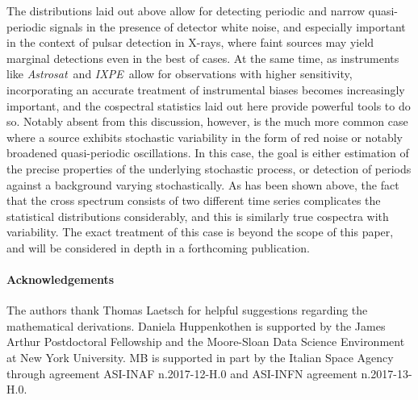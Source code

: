 \documentclass[12pt]{emulateapj}
\newcommand{\project}[1]{\textsl{#1}}
\newcommand{\astrosat}{\project{Astrosat}\xspace}
\newcommand{\ixpe}{\project{IXPE}\xspace}
\begin{document}
The distributions laid out above allow for detecting periodic and narrow quasi-periodic signals in the presence of detector white noise, and especially important in the context of pulsar detection in X-rays, where faint sources may yield marginal detections even in the best of cases. At the same time, as instruments like \astrosat\ and \ixpe\ allow for observations with higher sensitivity, incorporating an accurate treatment of instrumental biases becomes increasingly important, and the cospectral statistics laid out here provide powerful tools to do so.
Notably absent from this discussion, however, is the much more common case where a source exhibits stochastic variability in the form of red noise or notably broadened quasi-periodic oscillations. In this case, the goal is either estimation of the precise properties of the underlying stochastic process, or detection of periods against a background varying stochastically. As has been shown above, the fact that the cross spectrum consists of two different time series complicates the statistical distributions considerably, and this is similarly true cospectra with variability. The exact treatment of this case is beyond the scope of this paper, and will be considered in depth in a forthcoming publication. 


\paragraph{Acknowledgements}
The authors thank Thomas Laetsch for helpful suggestions regarding the mathematical derivations.
Daniela Huppenkothen is supported by the James Arthur Postdoctoral Fellowship and the Moore-Sloan Data Science Environment at New York University. 
MB is supported in part by the Italian Space Agency through agreement ASI-INAF n.2017-12-H.0 and ASI-INFN agreement n.2017-13-H.0.







\end{document}
